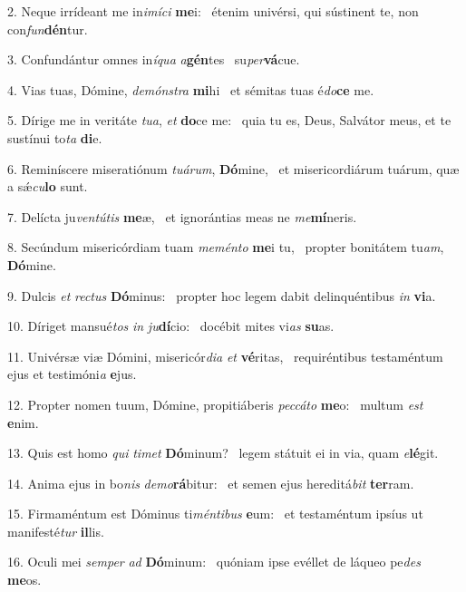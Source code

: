 2. Neque irrídeant me in\textit{i}\textit{mí}\textit{ci} \textbf{me}i: \ast\  étenim univérsi, qui sústinent te, non con\textit{fun}\textbf{dén}tur.\

3. Confundántur omnes in\textit{í}\textit{qua} \textit{a}\textbf{gén}tes \ast\  su\textit{per}\textbf{vá}cue.\

4. Vias tuas, Dómine, \textit{de}\textit{móns}\textit{tra} \textbf{mi}hi \ast\  et sémitas tuas é\textit{do}\textbf{ce} me.\

5. Dírige me in veritáte \textit{tu}\textit{a}, \textit{et} \textbf{do}ce me: \ast\  quia tu es, Deus, Salvátor meus, et te sustínui to\textit{ta} \textbf{di}e.\

6. Reminíscere miseratiónum \textit{tu}\textit{á}\textit{rum}, \textbf{Dó}mine, \ast\  et misericordiárum tuárum, quæ a sǽ\textit{cu}\textbf{lo} sunt.\

7. Delícta ju\textit{ven}\textit{tú}\textit{tis} \textbf{me}æ, \ast\  et ignorántias meas ne \textit{me}\textbf{mí}neris.\

8. Secúndum misericórdiam tuam \textit{me}\textit{mén}\textit{to} \textbf{me}i tu, \ast\  propter bonitátem tu\textit{am}, \textbf{Dó}mine.\

9. Dulcis \textit{et} \textit{rec}\textit{tus} \textbf{Dó}minus: \ast\  propter hoc legem dabit delinquéntibus \textit{in} \textbf{vi}a.\

10. Díriget mansué\textit{tos} \textit{in} \textit{ju}\textbf{dí}cio: \ast\  docébit mites vi\textit{as} \textbf{su}as.\

11. Univérsæ viæ Dómini, misericór\textit{di}\textit{a} \textit{et} \textbf{vé}ritas, \ast\  requiréntibus testaméntum ejus et testimóni\textit{a} \textbf{e}jus.\

12. Propter nomen tuum, Dómine, propitiáberis \textit{pec}\textit{cá}\textit{to} \textbf{me}o: \ast\  multum \textit{est} \textbf{e}nim.\

13. Quis est homo \textit{qui} \textit{ti}\textit{met} \textbf{Dó}minum? \ast\  legem státuit ei in via, quam \textit{e}\textbf{lé}git.\

14. Anima ejus in bo\textit{nis} \textit{de}\textit{mo}\textbf{rá}bitur: \ast\  et semen ejus hereditá\textit{bit} \textbf{ter}ram.\

15. Firmaméntum est Dóminus ti\textit{mén}\textit{ti}\textit{bus} \textbf{e}um: \ast\  et testaméntum ipsíus ut manifesté\textit{tur} \textbf{il}lis.\

16. Oculi mei \textit{sem}\textit{per} \textit{ad} \textbf{Dó}minum: \ast\  quóniam ipse evéllet de láqueo pe\textit{des} \textbf{me}os.\

